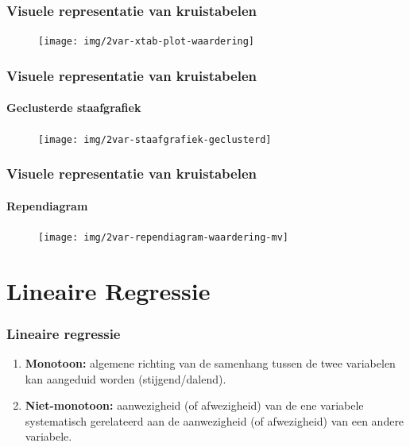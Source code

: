 \begin{frame}
	\frametitle{Visuele representatie van kruistabelen}
	
	\begin{figure}
		\centering
		\texttt{[image: img/2var-xtab-plot-waardering]}
	\end{figure}
	
\end{frame}

\begin{frame}
	\frametitle{Visuele representatie van kruistabelen}
	\framesubtitle{Geclusterde staafgrafiek}
	
	\begin{figure}
		\centering
		\texttt{[image: img/2var-staafgrafiek-geclusterd]}
	\end{figure}
	
\end{frame}

\begin{frame}
	\frametitle{Visuele representatie van kruistabelen}
	\framesubtitle{Rependiagram}
	
	\begin{figure}
		\centering
		\texttt{[image: img/2var-rependiagram-waardering-mv]}
	\end{figure}
	
\end{frame}

\section{Lineaire Regressie}
\sectionframelogo{}

\begin{frame}
	\frametitle{Lineaire regressie}
	
	
	\begin{enumerate}
		\item \textbf{Monotoon:} algemene richting van de samenhang tussen de twee variabelen kan aangeduid worden (stijgend/dalend).
		\item \textbf{Niet-monotoon:}  aanwezigheid (of afwezigheid) van de ene variabele systematisch gerelateerd aan de aanwezigheid (of afwezigheid) van een andere variabele.
	\end{enumerate}
\end{frame}

